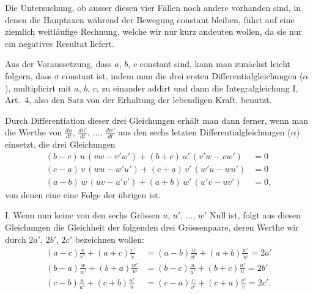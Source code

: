 \documentclass[12pt,a4paper]{book}
\theoremstyle{definition}
\theoremstyle{remark}
\begin{document}
Die Untersuchung, ob ausser diesen vier Fällen noch andere vorhanden sind, in denen die Hauptaxen während der Bewegung constant bleiben, führt auf eine ziemlich weitläufige Rechnung, welche wir nur kurz andeuten wollen, da sie nur ein negatives Resultat liefert.

Aus der Voraussetzung, dass $a$, $b$, $c$ constant sind, kann man zunächst leicht folgern, dass $\sigma$ constant ist, indem man die drei ersten Differentialgleichungen ($\alpha$), multiplicirt mit $a$, $b$, $c$, zu einander addirt und dann die Integralgleichung I, Art.~4, also den Satz von der Erhaltung der lebendigen Kraft, benutzt.

Durch Differentiation dieser drei Gleichungen erhält man dann ferner, wenn man die Werthe von $\frac{du}{dt}$, $\frac{du'}{dt}$, $\ldots$, $\frac{dw'}{dt}$ aus den sechs letzten Differentialgleichungen ($\alpha$) einsetzt, die drei Gleichungen
\begin{equation}
\tag{1}
\begin{aligned}
(b-c)\,u\,(vw - v'w') + (b+c)\,u'\,(v'w - vw') &= 0\\
(c-a)\,v\,(wu - w'u') + (c+a)\,v'\,(w'u - wu') &= 0\\
(a-b)\,w\,(uv - u'v') + (a+b)\,w'\,(u'v - uv') &= 0,
\end{aligned}
\end{equation}
von denen eine eine Folge der übrigen ist.

I. Wenn nun keine von den sechs Grössen $u$, $u'$, $\ldots$, $w'$ Null ist, folgt aus diesen Gleichungen die Gleichheit der folgenden drei Grössenpaare, deren Werthe wir durch $2a'$, $2b'$, $2c'$ bezeichnen wollen:
\begin{align*}
(a-c)\frac{v}{v'} + (a+c)\frac{v'}{v} &= (a-b)\frac{w}{w'} + (a+b)\frac{w'}{w} = 2a'\\
(b-a)\frac{w}{w'} + (b+a)\frac{w'}{w} &= (b-c)\frac{u}{u'} + (b+c)\frac{u'}{u} = 2b'\\
(c-b)\frac{u}{u'} + (c+b)\frac{u'}{u} &= (c-a)\frac{v}{v'} + (c+a)\frac{v'}{v} = 2c'.
\end{align*}
\end{document}
